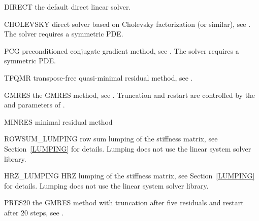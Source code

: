 \begin{memberdesc}[SolverOptions]{DIRECT}
the default direct linear solver.
\end{memberdesc}

\begin{memberdesc}[SolverOptions]{CHOLEVSKY}
direct solver based on Cholevsky factorization (or similar), see .
The solver requires a symmetric PDE.
\end{memberdesc}

\begin{memberdesc}[SolverOptions]{PCG}
preconditioned conjugate gradient method, see .
The solver requires a symmetric PDE.
\end{memberdesc}

\begin{memberdesc}[SolverOptions]{TFQMR}
transpose-free quasi-minimal residual method, see .
\end{memberdesc}

\begin{memberdesc}[SolverOptions]{GMRES}
the GMRES method, see .
Truncation and restart are controlled by the  and 
parameters of .
\end{memberdesc}

\begin{memberdesc}[SolverOptions]{MINRES}
minimal residual method
\end{memberdesc}

\begin{memberdesc}[SolverOptions]{ROWSUM_LUMPING}
row sum lumping of the stiffness matrix, see Section~\ref{LUMPING} for details.
Lumping does not use the linear system solver library.
\end{memberdesc}

\begin{memberdesc}[SolverOptions]{HRZ_LUMPING}
HRZ lumping of the stiffness matrix, see Section~\ref{LUMPING} for details.
Lumping does not use the linear system solver library.
\end{memberdesc}

\begin{memberdesc}[SolverOptions]{PRES20}
the GMRES method with truncation after five residuals and restart after
20 steps, see .
\end{memberdesc}

